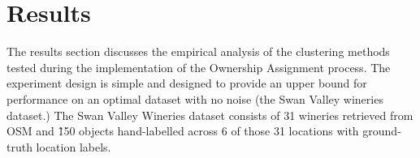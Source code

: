 \section{Results}
\label{section:results}

The results section discusses the empirical analysis of the clustering methods tested during the implementation of the Ownership Assignment process. 
The experiment design is simple and designed to provide an upper bound for performance on an optimal dataset with no noise (the Swan Valley wineries dataset.) 
The Swan Valley Wineries dataset consists of 31 wineries retrieved from OSM and \~150 objects hand-labelled across 6 of those 31 locations with ground-truth location labels. 




